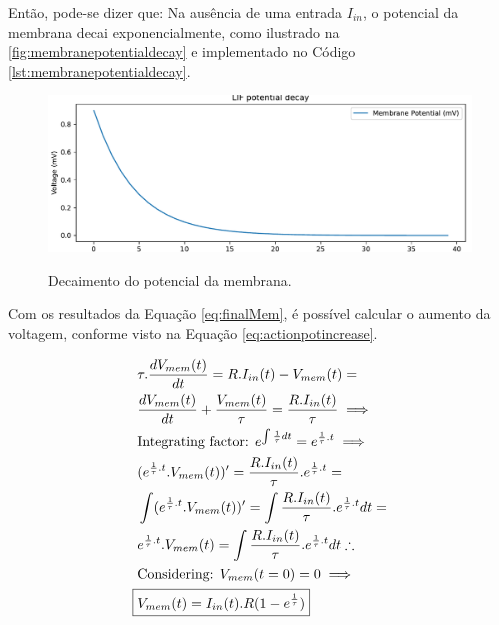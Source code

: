 			\par Então, pode-se dizer que: Na ausência de uma entrada $I_{in}$, o potencial da membrana decai exponencialmente, como ilustrado na  \autoref{fig:membranepotentialdecay} e implementado no Código \autoref{lst:membranepotentialdecay}.
			
			
			
			\begin{figure}[H]
				\centering
				\caption{Decaimento do potencial da membrana.}
				\includegraphics[width=.7\linewidth]{images/membranePotentialDecay}
				\label{fig:membranepotentialdecay}
			\end{figure}
			
			\par Com os resultados da Equação \autoref{eq:finalMem}, é possível calcular o aumento da voltagem, conforme visto na Equação \autoref{eq:actionpotincrease}.
			
			\begin{equation}
				\label{eq:actionpotincrease}
				\begin{aligned}
					&\tau.\dfrac{dV_{mem}(t)}{dt} = R.I_{in}(t) - V_{mem}(t) = \\
					&\dfrac{dV_{mem}(t)}{dt} + \frac{V_{mem}(t)}{\tau} = \frac{R.I_{in}(t)}{\tau} \implies \\
					&\text{Integrating factor: } e^{\int \frac{1}{\tau} dt} = e^{\frac{1}{\tau}.t} \implies \\
					&(e^{\frac{1}{\tau}.t}.V_{mem}(t))' = \frac{R.I_{in}(t)}{\tau}.e^{\frac{1}{\tau}.t} = \\
					&\int (e^{\frac{1}{\tau}.t}.V_{mem}(t))' = \int \frac{R.I_{in}(t)}{\tau}.e^{\frac{1}{\tau}.t} dt = \\
					&e^{\frac{1}{\tau}.t}.V_{mem}(t) = \int \frac{R.I_{in}(t)}{\tau}.e^{\frac{1}{\tau}.t} dt \therefore \\
					& \text{Considering: } V_{mem}(t=0) = 0 \implies \\
					\Aboxed{&V_{mem}(t) = I_{in}(t).R(1-e^{\frac{1}{\tau}})}
				\end{aligned}
			\end{equation}
			
